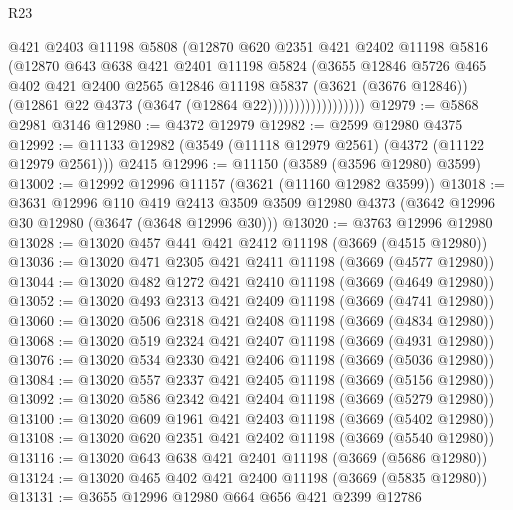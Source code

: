 \begin{lexlean}{R23}
\begin{coremodule}
                            @421
                            @2403
                            @11198
                            @5808
                            (@12870
                              @620
                              @2351
                              @421
                              @2402
                              @11198
                              @5816
                              (@12870
                                @643
                                @638
                                @421
                                @2401
                                @11198
                                @5824
                                (@3655
                                  @12846
                                  @5726
                                  @465
                                  @402
                                  @421
                                  @2400
                                  @2565
                                  @12846
                                  @11198
                                  @5837
                                  (@3621 (@3676 @12846))
                                  (@12861 @22 @4373 (@3647 (@12864 @22))))))))))))))))))
@12979 := @5868 @2981 @3146
@12980 := @4372 @12979
@12982 := @2599 @12980 @4375
@12992 := @11133 @12982 (@3549 (@11118 @12979 @2561) (@4372 (@11122 @12979 @2561))) @2415
@12996 := @11150 (@3589 (@3596 @12980) @3599)
@13002 := @12992 @12996 @11157 (@3621 (@11160 @12982 @3599))
@13018 := @3631
    @12996
    @110
    @419
    @2413
    @3509
    @3509
    @12980
    @4373
    (@3642 @12996 @30 @12980 (@3647 (@3648 @12996 @30)))
@13020 := @3763 @12996 @12980
@13028 := @13020 @457 @441 @421 @2412 @11198 (@3669 (@4515 @12980))
@13036 := @13020 @471 @2305 @421 @2411 @11198 (@3669 (@4577 @12980))
@13044 := @13020 @482 @1272 @421 @2410 @11198 (@3669 (@4649 @12980))
@13052 := @13020 @493 @2313 @421 @2409 @11198 (@3669 (@4741 @12980))
@13060 := @13020 @506 @2318 @421 @2408 @11198 (@3669 (@4834 @12980))
@13068 := @13020 @519 @2324 @421 @2407 @11198 (@3669 (@4931 @12980))
@13076 := @13020 @534 @2330 @421 @2406 @11198 (@3669 (@5036 @12980))
@13084 := @13020 @557 @2337 @421 @2405 @11198 (@3669 (@5156 @12980))
@13092 := @13020 @586 @2342 @421 @2404 @11198 (@3669 (@5279 @12980))
@13100 := @13020 @609 @1961 @421 @2403 @11198 (@3669 (@5402 @12980))
@13108 := @13020 @620 @2351 @421 @2402 @11198 (@3669 (@5540 @12980))
@13116 := @13020 @643 @638 @421 @2401 @11198 (@3669 (@5686 @12980))
@13124 := @13020 @465 @402 @421 @2400 @11198 (@3669 (@5835 @12980))
@13131 := @3655 @12996 @12980 @664 @656 @421 @2399 @12786

\end{coremodule}
\end{lexlean}
